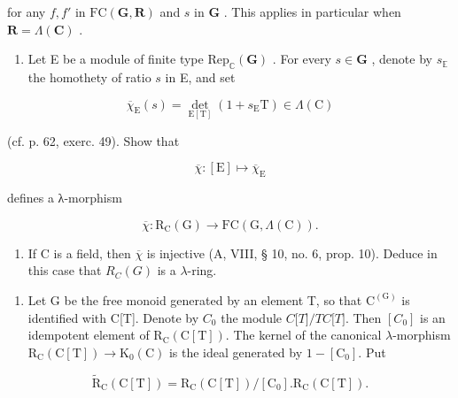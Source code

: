 for any \(f, f'\) in \(\mathrm{FC}(\mathbf{G}, \mathbf{R})\) and \(s\) in \(\mathbf{G}\) . This applies in particular when \(\mathbf{R} = \Lambda(\mathbf{C})\) .

\begin{enumerate}
\def\labelenumi{\alph{enumi})}
\setcounter{enumi}{3}
\tightlist
\item
  Let E be a module of finite type \(\mathrm{Rep}_{\mathbb{C}}(\mathbf{G})\) . For every \(s \in \mathbf{G}\) , denote by \(s_{\mathbb{E}}\) the homothety of ratio \(s\) in E, and set
\end{enumerate}

\[
\overline {{{{\chi}}}} _ {\mathrm{E}} (s) = \det _ {\mathrm{E} [ \mathrm{T} ]} (1 + s _ {\mathrm{E}} \mathrm{T}) \in \Lambda (\mathrm{C})
\]

(cf. p. 62, exerc. 49). Show that

\[
\overline {{{{\chi}}}}: [ \mathrm{E} ] \mapsto \overline {{{{\chi}}}} _ {\mathrm{E}}
\]

defines a λ-morphism

\[
\overline {{{{\chi}}}}: \mathrm{R} _ {\mathrm{C}} (\mathrm{G}) \rightarrow \mathrm{FC} (\mathrm{G}, \Lambda (\mathrm{C})).
\]

\begin{enumerate}
\def\labelenumi{\alph{enumi})}
\setcounter{enumi}{4}
\tightlist
\item
  If C is a field, then \(\overline{\chi}\) is injective (A, VIII, § 10, no. 6, prop. 10). Deduce in this case that \(R_{C}(G)\) is a \(\lambda\)-ring.
\end{enumerate}

\begin{enumerate}
\def\labelenumi{\arabic{enumi})}
\setcounter{enumi}{55}
\tightlist
\item
  Let G be the free monoid generated by an element T, so that \(\mathrm{C}^{(\mathrm{G})}\) is identified with C{[}T{]}. Denote by \(C_{0}\) the module \(C{[}T{]}/T C{[}T{]}\). Then \([C_{0}]\) is an idempotent element of \(\mathrm{R}_{\mathrm{C}}(\mathrm{C}[\mathrm{T}])\). The kernel of the canonical \(\lambda\)-morphism \(\mathrm{R}_{\mathrm{C}}(\mathrm{C}[\mathrm{T}]) \rightarrow \mathrm{K}_{0}(\mathrm{C})\) is the ideal generated by \(1 - [\mathrm{C}_{0}]\). Put
\end{enumerate}

\[
\tilde {\mathrm{R}} _ {\mathrm{C}} (\mathrm{C} [ \mathrm{T} ]) = \mathrm{R} _ {\mathrm{C}} (\mathrm{C} [ \mathrm{T} ]) / [ \mathrm{C} _ {0} ]. \mathrm{R} _ {\mathrm{C}} (\mathrm{C} [ \mathrm{T} ]).
\]

